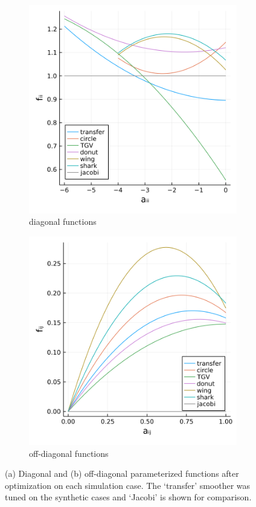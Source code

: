 \documentclass[review]{elsarticle}
\begin{document}
\begin{figure}
    \centering
    \begin{subfigure}[b]{0.47\textwidth}
        \centering
        \includegraphics[width=\textwidth]{figures/diag_fun.png}
        \caption{diagonal functions}
    \end{subfigure}
    \hfill
    \begin{subfigure}[b]{0.47\textwidth}
        \centering
        \includegraphics[width=\textwidth]{figures/lower_fun.png}
        \caption{off-diagonal functions}
    \end{subfigure}
        \caption{(a) Diagonal and (b) off-diagonal parameterized functions after optimization on each simulation case. The `transfer' smoother was tuned on the synthetic cases and `Jacobi' is shown for comparison.}
        \label{fig:tuned inverse}
\end{figure}
\end{document}
